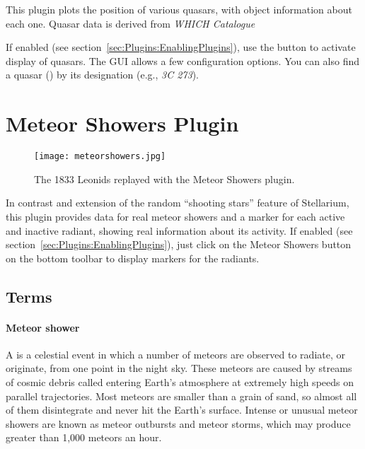 \noindent This plugin plots the position of various quasars, with object
information about each one. Quasar data is derived from \textit{WHICH Catalogue} 


If enabled (see section~\ref{sec:Plugins:EnablingPlugins}), use the
 button to activate display of
quasars. The GUI allows a few configuration options.  You can also
find a quasar () by its designation (e.g., \emph{3C 273}).


\newpage


\section{Meteor Showers Plugin}
\label{sec:plugins:MeteorShowers}

\begin{figure}[ht]
\texttt{[image: meteorshowers.jpg]}
\label{fig:plugins:MeteorShowers}
\caption{The 1833 Leonids replayed with the Meteor Showers plugin.}
\end{figure}

\noindent In contrast and extension of the random ``shooting stars''
feature of Stellarium, this plugin provides data for real meteor
showers and a marker for each active and inactive radiant, showing
real information about its activity. If enabled (see
section~\ref{sec:Plugins:EnablingPlugins}), just click on the
Meteor Showers button   on the bottom
toolbar to display markers for the radiants.


\subsection{Terms}
\label{sec:plugins:MeteorShowers:terms}

\paragraph{Meteor shower}
A  is a celestial event in which a number of
meteors are observed to radiate, or originate, from one point in the
night sky. These meteors are caused by streams of cosmic debris called
 entering Earth's atmosphere at extremely high speeds on
parallel trajectories. Most meteors are smaller than a grain of sand,
so almost all of them disintegrate and never hit the Earth's
surface. Intense or unusual meteor showers are known as meteor
outbursts and meteor storms, which may produce greater than 1,000
meteors an hour.

